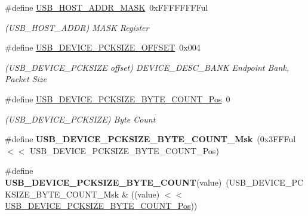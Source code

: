\begin{DoxyCompactItemize}
\item 
\hypertarget{group___s_a_m_l21___u_s_b_ga6325bca8d8a0084c948acf6c3e60204e}{}\#define \hyperlink{group___s_a_m_l21___u_s_b_ga6325bca8d8a0084c948acf6c3e60204e}{U\+S\+B\+\_\+\+H\+O\+S\+T\+\_\+\+A\+D\+D\+R\+\_\+\+M\+A\+S\+K}~0x\+F\+F\+F\+F\+F\+F\+F\+Ful\label{group___s_a_m_l21___u_s_b_ga6325bca8d8a0084c948acf6c3e60204e}

\begin{DoxyCompactList}\small\item\em (U\+S\+B\+\_\+\+H\+O\+S\+T\+\_\+\+A\+D\+D\+R) M\+A\+S\+K Register \end{DoxyCompactList}\item 
\hypertarget{group___s_a_m_l21___u_s_b_ga187e4d2e49f2a3394c148f8ab1d49020}{}\#define \hyperlink{group___s_a_m_l21___u_s_b_ga187e4d2e49f2a3394c148f8ab1d49020}{U\+S\+B\+\_\+\+D\+E\+V\+I\+C\+E\+\_\+\+P\+C\+K\+S\+I\+Z\+E\+\_\+\+O\+F\+F\+S\+E\+T}~0x004\label{group___s_a_m_l21___u_s_b_ga187e4d2e49f2a3394c148f8ab1d49020}

\begin{DoxyCompactList}\small\item\em (U\+S\+B\+\_\+\+D\+E\+V\+I\+C\+E\+\_\+\+P\+C\+K\+S\+I\+Z\+E offset) D\+E\+V\+I\+C\+E\+\_\+\+D\+E\+S\+C\+\_\+\+B\+A\+N\+K Endpoint Bank, Packet Size \end{DoxyCompactList}\item 
\hypertarget{group___s_a_m_l21___u_s_b_gaef4d998ef9773a987ac4d050a6a2d10b}{}\#define \hyperlink{group___s_a_m_l21___u_s_b_gaef4d998ef9773a987ac4d050a6a2d10b}{U\+S\+B\+\_\+\+D\+E\+V\+I\+C\+E\+\_\+\+P\+C\+K\+S\+I\+Z\+E\+\_\+\+B\+Y\+T\+E\+\_\+\+C\+O\+U\+N\+T\+\_\+\+Pos}~0\label{group___s_a_m_l21___u_s_b_gaef4d998ef9773a987ac4d050a6a2d10b}

\begin{DoxyCompactList}\small\item\em (U\+S\+B\+\_\+\+D\+E\+V\+I\+C\+E\+\_\+\+P\+C\+K\+S\+I\+Z\+E) Byte Count \end{DoxyCompactList}\item 
\hypertarget{group___s_a_m_l21___u_s_b_ga14ac2c886ec23dc681a02ae8eab21bee}{}\#define {\bfseries U\+S\+B\+\_\+\+D\+E\+V\+I\+C\+E\+\_\+\+P\+C\+K\+S\+I\+Z\+E\+\_\+\+B\+Y\+T\+E\+\_\+\+C\+O\+U\+N\+T\+\_\+\+Msk}~(0x3\+F\+F\+Ful $<$$<$ U\+S\+B\+\_\+\+D\+E\+V\+I\+C\+E\+\_\+\+P\+C\+K\+S\+I\+Z\+E\+\_\+\+B\+Y\+T\+E\+\_\+\+C\+O\+U\+N\+T\+\_\+\+Pos)\label{group___s_a_m_l21___u_s_b_ga14ac2c886ec23dc681a02ae8eab21bee}

\item 
\hypertarget{group___s_a_m_l21___u_s_b_ga2b9cfcd30f8cdbd2d547828005d09e7b}{}\#define {\bfseries U\+S\+B\+\_\+\+D\+E\+V\+I\+C\+E\+\_\+\+P\+C\+K\+S\+I\+Z\+E\+\_\+\+B\+Y\+T\+E\+\_\+\+C\+O\+U\+N\+T}(value)~(U\+S\+B\+\_\+\+D\+E\+V\+I\+C\+E\+\_\+\+P\+C\+K\+S\+I\+Z\+E\+\_\+\+B\+Y\+T\+E\+\_\+\+C\+O\+U\+N\+T\+\_\+\+Msk \& ((value) $<$$<$ \hyperlink{group___s_a_m_l21___u_s_b_gaef4d998ef9773a987ac4d050a6a2d10b}{U\+S\+B\+\_\+\+D\+E\+V\+I\+C\+E\+\_\+\+P\+C\+K\+S\+I\+Z\+E\+\_\+\+B\+Y\+T\+E\+\_\+\+C\+O\+U\+N\+T\+\_\+\+Pos}))\label{group___s_a_m_l21___u_s_b_ga2b9cfcd30f8cdbd2d547828005d09e7b}


\end{DoxyCompactItemize}
